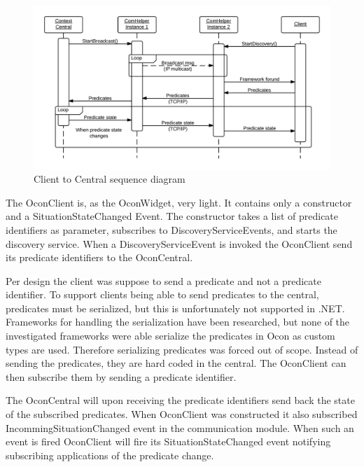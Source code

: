 \documentclass[../report.tex]{subfiles}
\begin{document}
\begin{figure}
\hspace{-70px}
\includegraphics[width=500px]{comHelperSequence-client.png}
\caption{Client to Central sequence diagram}
\label{fig:clientComHelper}
\end{figure}

The OconClient is, as the OconWidget, very light. It contains only a constructor and a SituationStateChanged Event. The constructor takes a list of predicate identifiers as parameter, subscribes to DiscoveryServiceEvents, and starts the discovery service. When a DiscoveryServiceEvent is invoked the OconClient send its predicate identifiers to the OconCentral.

Per design the client was suppose to send a predicate and not a predicate identifier. To support clients being able to send predicates to the central, predicates must be serialized, but this is unfortunately not supported in .NET. Frameworks for handling the serialization have been researched, but none of the investigated frameworks were able serialize the predicates in Ocon as custom types are used. Therefore serializing predicates was forced out of scope. Instead of sending the predicates, they are hard coded in the central. The OconClient can then subscribe them by sending a predicate identifier. 


The OconCentral will upon receiving the predicate identifiers send back the state of the subscribed predicates. When OconClient was constructed it also subscribed IncommingSituationChanged event in the communication module. When such an event is fired OconClient will fire its SituationStateChanged event notifying subscribing applications of the predicate change.
\end{document}
